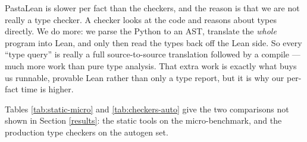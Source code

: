 \documentclass{article}
\begin{document}
PastaLean is slower per fact than the checkers, and the reason is that we are not really a type checker. A checker looks at the code and reasons about types directly. We do more: we parse the Python to an AST, translate the \emph{whole} program into Lean, and only then read the types back off the Lean side. So every ``type query'' is really a full source-to-source translation followed by a compile --- much more work than pure type analysis. That extra work is exactly what buys us runnable, provable Lean rather than only a type report, but it is why our per-fact time is higher.


Tables \ref{tab:static-micro} and \ref{tab:checkers-auto} give the two comparisons not shown in Section \ref{results}: the static tools on the micro-benchmark, and the production type checkers on the autogen set.
\end{document}
